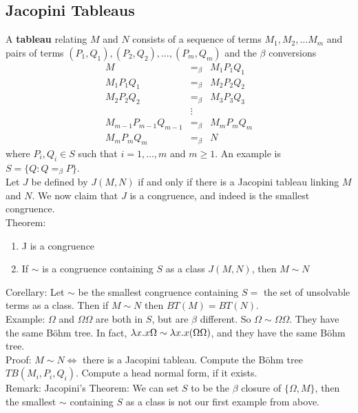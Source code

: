 \subsection{Jacopini Tableaus}
A \textbf{tableau} relating $M$ and $N$ consists of a sequence of terms $M_1,M_2,\ldots M_m$ and pairs of terms $(P_1,Q_1),(P_2,Q_2),\ldots,(P_m,Q_m)$ and the $\beta$ conversions
\begin{eqnarray*}
  M &=_\beta& M_1P_1Q_1\\
  M_1P_1Q_1 &=_\beta& M_2P_2Q_2\\
  M_2P_2Q_2 &=_\beta& M_3P_3Q_3\\
  &\vdots&\\
  M_{m-1}P_{m-1}Q_{m-1} &=_\beta& M_mP_mQ_m\\
  M_mP_mQ_m &=_\beta& N
\end{eqnarray*}
where $P_i, Q_i \in S$ such that $i = 1,\ldots,m$ and $m \geq 1$. An example is $S = \{Q : Q =_\beta P\}$.\\

Let $J$ be defined by $J(M,N)$ if and only if there is a Jacopini tableau linking $M$ and $N$. We now claim that $J$ is a congruence, and indeed is the smallest congruence.\\

Theorem:
\begin{enumerate}[(1)]
  \item J is a congruence
  \item If $\sim$ is a congruence containing $S$ as a class $J(M,N)$, then $M \sim N$
\end{enumerate}

Corellary: Let $\sim$ be the smallest congruence containing $S = $ the set of unsolvable terms as a class. Then if $M \sim N$ then $BT(M) = BT(N)$.\\

Example: $\Omega$ and $\Omega\Omega$ are both in $S$, but are $\beta$ different. So $\Omega \sim \Omega\Omega$. They have the same B\"ohm tree. In fact, $\lambda x .x\Omega \sim \lambda x. x(\Omega\Omega)$, and they have the same B\"ohm tree.\\

Proof: $M \sim N \Leftrightarrow$ there is a Jacopini tableau. Compute the B\"ohm tree $TB(M_i,P_i,Q_i)$. Compute a head normal form, if it exists.\\

Remark: Jacopini's Theorem: We can set $S$ to be the $\beta$ closure of $\{\Omega,M\}$, then the smallest $\sim$ containing $S$ as a class is not our first example from above.\\